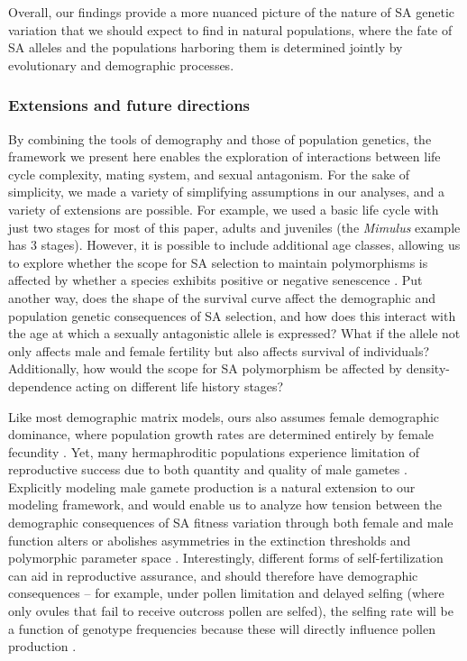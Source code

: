 \documentclass[11pt]{article}
\begin{document}
Overall, our findings provide a more nuanced picture of the nature of SA genetic variation that we should expect to find in natural populations, where the fate of SA alleles and the populations harboring them is determined jointly by evolutionary and demographic processes.


\subsubsection*{Extensions and future directions}

By combining the tools of demography and those of population genetics, the framework we present here enables the exploration of interactions between life cycle complexity, mating system, and sexual antagonism. For the sake of simplicity, we made a variety of simplifying assumptions in our analyses, and a variety of extensions are possible. For example, we used a basic life cycle with just two stages for most of this paper, adults and juveniles (the \textit{Mimulus} example has $3$ stages). However, it is possible to include additional age classes, allowing us to explore whether the scope for SA selection to maintain polymorphisms is affected by whether a species exhibits positive or negative senescence \citep{jones2014diversity}. Put another way, does the shape of the survival curve affect the demographic and population genetic consequences of SA selection, and how does this interact with the age at which a sexually antagonistic allele is expressed? What if the allele not only affects male and female fertility but also affects survival of individuals? Additionally, how would the scope for SA polymorphism be affected by density-dependence acting on different life history stages?

Like most demographic matrix models, ours also assumes female demographic dominance, where population growth rates are determined entirely by female fecundity \citep{Caswell2001,CaswellEtAl2018,deVriesCaswell2019b}. Yet, many hermaphroditic populations experience limitation of reproductive success due to both quantity and quality of male gametes \citep[e.g.,][]{Yund2000,AizenHarder2007, Harder2016}. Explicitly modeling male gamete production is a natural extension to our modeling framework, and would enable us to analyze how tension between the demographic consequences of SA fitness variation through both female and male function alters or abolishes asymmetries in the extinction thresholds and polymorphic parameter space \citep[e.g.,][]{Tazzyman2015}.  Interestingly, different forms of self-fertilization can aid in reproductive assurance, and should therefore have demographic consequences -- for example, under pollen limitation and delayed selfing (where only ovules that fail to receive outcross pollen are selfed), the selfing rate will be a function of genotype frequencies because these will directly influence pollen production \citep{HarderBarrett2006}.
\end{document}
